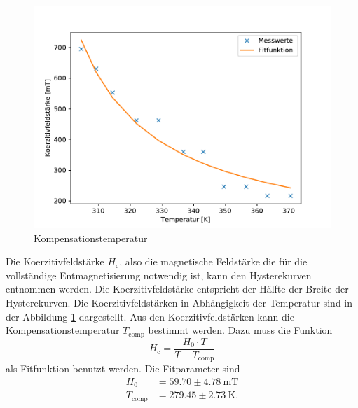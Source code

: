 \begin{figure}[H]
\centering
\includegraphics[scale=0.8]{../Messdaten/auswertung/Kompensationstemperatur.pdf}
\caption{Kompensationstemperatur}
\label{fig:koerzitivfeldstaerke}
\end{figure}

Die Koerzitivfeldstärke $H_\mathrm{c}$, also die magnetische Feldstärke die für die vollständige Entmagnetisierung notwendig ist, kann den Hysterekurven entnommen werden. 
Die Koerzitivfeldstärke entspricht der Hälfte der Breite der Hysterekurven. 
Die Koerzitivfeldstärken in Abhängigkeit der Temperatur sind in der Abbildung \ref{fig:koerzitivfeldstaerke} dargestellt. 
Aus den Koerzitivfeldstärken kann die Kompensationstemperatur $T_\mathrm{comp}$ bestimmt  
werden.
Dazu muss die Funktion  
\begin{equation}
H_\mathrm{c} = \frac{H_0 \cdot T}{T-T_\mathrm{comp}}
\label{eq:koerzitivfeldstaerke} 
\end{equation}
als Fitfunktion benutzt werden.
Die Fitparameter sind
\begin{align}
H_0 & = 59.70 \pm 4.78\ \mathrm{mT}\\
T_\mathrm{comp} & = 279.45 \pm 2.73\ \mathrm{K} .
\label{eq:fitwerte}
\end{align}

 
